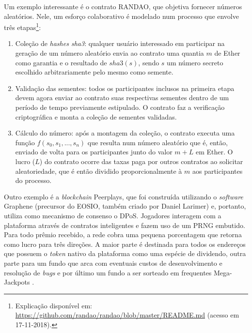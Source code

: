 \documentclass[a4paper,12pt]{monografia}
\theoremstyle{plain}
\theoremstyle{definition}
\theoremstyle{remark}
\begin{document}
Um exemplo interessante \'{e} o contrato RANDAO, que objetiva fornecer n\'umeros aleat\'orios.
Nele, um esfor\c{c}o colaborativo \'{e} modelado num processo que envolve tr\^{e}s etapas\footnote{Explica\c{c}\~{a}o dispon\'{i}vel em: \url{https://github.com/randao/randao/blob/master/README.md} (acesso em 17-11-2018).}:

\begin{enumerate}
  \item Cole\c{c}\~{a}o de \textit{hashes sha3}: qualquer usu\'{a}rio interessado em participar na gera\c{c}\~{a}o de um n\'{u}mero aleat\'{o}rio envia ao contrato uma quantia $m$ de Ether como garantia e o resultado de $sha3(s)$, sendo $s$ um n\'{u}mero secreto escolhido arbitrariamente pelo mesmo como semente.
  \item Valida\c{c}\~{a}o das sementes: todos os participantes inclusos na primeira etapa devem agora enviar ao contrato suas respectivas sementes dentro de um per\'{i}odo de tempo previamente estipulado. O contrato faz a verifica\c{c}\~{a}o criptogr\'{a}fica e monta a cole\c{c}\~{a}o de sementes validadas.
  \item C\'{a}lculo do n\'{u}mero: ap\'{o}s a montagem da cole\c{c}\~{a}o, o contrato executa uma fun\c{c}\~{a}o $f(s_0,s_1,...,s_n)$ que resulta num n\'{u}mero aleat\'{o}rio que \'{e}, ent\~{a}o, enviado de volta para os participantes junto do valor $m+L$ em Ether. O lucro ($L$) do contrato ocorre das taxas paga por outros contratos ao solicitar aleatoriedade, que \'{e} ent\~{a}o dividido proporcionalmente \`{a} $m$ aos participantes do processo.
\end{enumerate}

Outro exemplo \'e a \textit{blockchain} Peerplays, que foi constru\'{i}da utilizando o \textit{software} Graphene (precursor do EOSIO, tamb\'em criado por Daniel Larimer) e, portanto, utiliza como mecanismo de consenso o DPoS.
Jogadores interagem com a plataforma atrav\'{e}s de contratos inteligentes e fazem uso de um PRNG embutido.
Para todo pr\^{e}mio recebido, a rede cobra uma pequena porcentagem que retorna como lucro para tr\^{e}s dire\c{c}\~{o}es.
A maior parte \'{e} destinada para todos os endere\c{c}os que possuem o \textit{token} nativo da plataforma como uma esp\'{e}cie de dividendo, outra parte para um fundo que arca com eventuais custos de desenvolvimento e resolu\c{c}\~{a}o de \textit{bugs} e por \'{u}ltimo um fundo a ser sorteado em frequentes Mega-Jackpots \cite{peerplays}.
\end{document}
